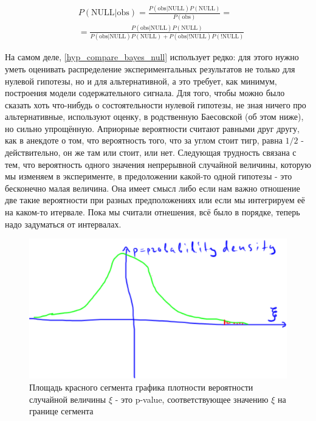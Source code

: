 \documentclass{book}
\begin{document}
\begin{align}\label{hyp_compare_bayes_null}
   &P\left(\text{NULL|obs}\right)=
   \frac{P\left(\text{obs|NULL}\right) P\left(\text{NULL}\right)}{P\left(\text{obs}\right)} = \nonumber \\
   &=\frac{P\left(\text{obs|NULL}\right) P\left(\text{NULL}\right)}{P\left(\text{obs|NULL}\right) P\left(\text{NULL}\right)+P\left(\text{obs|!NULL}\right) P\left(\text{!NULL}\right)} 
\end{align}

На самом деле, \eqref{hyp_compare_bayes_null} использует редко: для этого нужно уметь оценивать распределение экспериментальных результатов не только для нулевой гипотезы, но и для альтернативной, а это требует, как минимум, построения модели содержательного сигнала. Для того, чтобы можно было сказать хоть что-нибудь о состоятельности нулевой гипотезы, не зная ничего про альтернативные, используют оценку, в родственную Баесовской (об этом ниже), но сильно упрощённую. Априорные вероятности считают равными друг другу, как в анекдоте о том, что вероятность того, что за углом стоит тигр, равна $1/2$ - действительно, он же там или стоит, или нет. Следующая трудность связана с тем, что вероятность одного значения непрерывной случайной величины, которую мы изменяем в эксперименте, в предоложении какой-то одной гипотезы - это бесконечно малая величина. Она имеет смысл либо если нам важно отношение две такие вероятности при разных предположениях или если мы интегрируем её на каком-то итервале. Пока мы считали отнешения, всё было в порядке, теперь надо задуматься от интервалах.

\begin{figure}
    \centering
    \includegraphics[scale=.5]{img/p-value.png}
    \caption{Площадь красного сегмента графика плотности вероятности случайной величины $\xi$ - это p-value, соответствующее значению $\xi$ на границе сегмента}
    \label{pval}
\end{figure}



\end{document}
